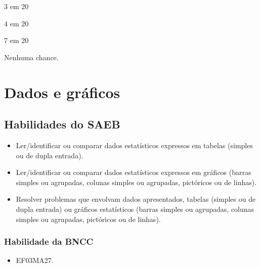 \begin{escolha}
\item
3 em 20
\item
4 em 20
\item
7 em 20
\item
Nenhuma chance.
\end{escolha}

\chapter{Dados e gráficos}

\section*{Habilidades do SAEB}

\begin{itemize}
\item Ler/identificar ou comparar dados estatísticos expressos em tabelas
(simples ou de dupla entrada).

\item Ler/identificar ou comparar dados estatísticos expressos em gráficos
(barras simples ou agrupadas, colunas simples ou agrupadas, pictóricos
ou de linhas).

\item Resolver problemas que envolvam dados apresentados, tabelas (simples ou
de dupla entrada) ou gráficos estatísticos (barras simples ou agrupadas,
colunas simples ou agrupadas, pictóricos ou de linhas).
\end{itemize}

\subsection{Habilidade da BNCC}

\begin{itemize}
  \item 
 EF03MA27.
\end{itemize}

\pagebreak

